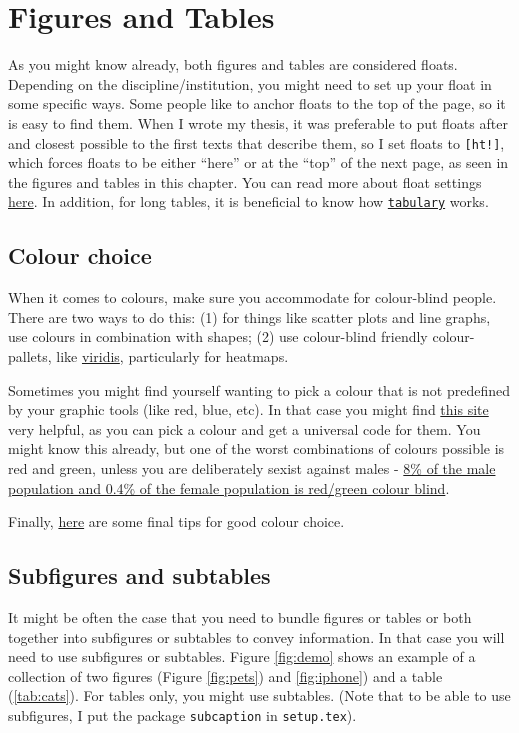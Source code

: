 \chapter{Figures and Tables}
As you might know already, both figures and tables are considered \glspl{float}. Depending on the discipline/institution, you might need to set up your float in some specific ways. Some people like to anchor floats to the top of the page, so it is easy to find them. When I wrote my thesis, it was preferable to put floats after and closest possible to the first texts that describe them, so I set floats to \texttt{[ht!]}, which forces floats to be either ``here'' or at the ``top'' of the next page, as seen in the figures and tables in this chapter. You can read more about float settings \href{https://www.overleaf.com/learn/latex/Positioning_of_Figures}{here}. In addition, for long tables, it is beneficial to know how \href{https://mirror.aarnet.edu.au/pub/CTAN/macros/latex/contrib/tabulary/tabulary.pdf}{\texttt{tabulary}} works.

\section{Colour choice}

When it comes to colours, make sure you accommodate for colour-blind people. There are two ways to do this: (1) for things like scatter plots and line graphs, use colours in combination with shapes; (2) use colour-blind friendly colour-pallets, like \href{https://cran.r-project.org/web/packages/viridis/vignettes/intro-to-viridis.html}{viridis}, particularly for heatmaps. 

Sometimes you might find yourself wanting to pick a colour that is not predefined by your graphic tools (like red, blue, etc). In that case you might find \href{https://www.w3schools.com/colors/colors_picker.asp}{this site} very helpful, as you can pick a colour and get a universal code for them. You might know this already, but one of the worst combinations of colours possible is red and green, unless you are deliberately sexist against males - \href{https://visioneyeinstitute.com.au/eyematters/colour-blindness/}{8\% of the male population and 0.4\% of the female population is red/green colour blind}.

Finally, \href{https://betterfigures.org/2015/06/23/picking-a-colour-scale-for-scientific-graphics/}{here} are some final tips for good colour choice.

\section{Subfigures and subtables}

It might be often the case that you need to bundle figures or tables or both together into subfigures or subtables to convey information. In that case you will need to use subfigures or subtables. Figure \ref{fig:demo} shows an example of a collection of two figures (Figure \ref{fig:pets}) and \ref{fig:iphone}) and a table (\ref{tab:cats}). For tables only, you might use subtables. (Note that to be able to use subfigures, I put the package \texttt{subcaption} in \texttt{setup.tex}).



